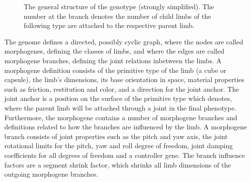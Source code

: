 \documentclass[main]{subfiles}
\begin{document}
\begin{figure}[H]
\end{figure}


\begin{figure}[H]
\center
{}
\caption{The general structure of the genotype (strongly simplified). The number at the branch denotes the number of child limbs of the following type are attached to the respective parent limb.}
\label{figure:genotype}
\end{figure}

The genome defines a directed, possibly cyclic graph, where the nodes are called morphogenes, defining the classes of limbs, and where the edges are called morphogene branches, defining the joint relations inbetween the limbs. A morphogene definition consists of the primitive type of the limb (a cube or capsule), the limb's dimensions, its base orientation in space, material properties such as friction, restitution and color, and a direction for the joint anchor. The joint anchor is a position on the surface of the primitive type which denotes, where the parent limb will be attached through a joint in the final phenotype. Furthermore, the morphogene contains a number of morphogene branches and definitions related to how the branches are influenced by the limb. A morphogene branch consists of joint properties such as the pitch and yaw axis, the joint rotational limits for the pitch, yaw and roll degree of freedom, joint damping coefficients for all degrees of freedom and a controller gene.
The branch influence factors are a segment shrink factor, which shrinks all limb dimensions of the outgoing morphogene branches.
\end{document}

